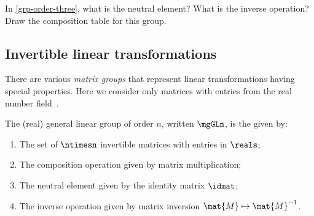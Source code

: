 \begin{gradedexercise}
    \label{ex:GroupWithThreeElements}
    In \cref{grp-order-three}, what is the neutral element?
    What is the inverse operation?
    Draw the composition table for this group.
\end{gradedexercise}




\subsection{Invertible linear transformations}
\label{sec:matrix-grps}


There are various \emph{matrix groups} that represent linear transformations having special properties.
Here we consider only matrices with entries from the real number field~\reals.



\begin{definition}
    \label{def:general-linear-group}
    The (real) general linear group of order $n$, written $\mgGLn$,
    is the  given by:

    \constit
    \begin{enumerate}
        \item The set of $\ntimesn$ invertible matrices with entries in $\reals$;
        \item The composition operation given by matrix multiplication;
        \item The neutral element given by the identity matrix $\idmat$;
        \item The inverse operation given by matrix inversion $\mat{M} \mapsto \mat{M}^{-1}$.
    \end{enumerate}
\end{definition}



